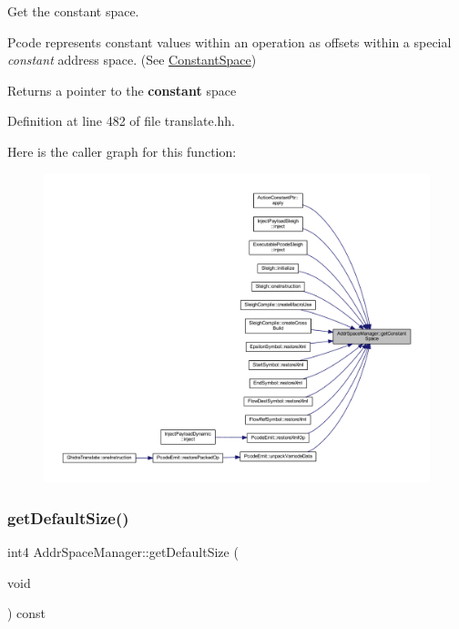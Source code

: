 Get the constant space. 

Pcode represents constant values within an operation as offsets within a special {\itshape constant} address space. (See \mbox{\hyperlink{class_constant_space}{Constant\+Space}}) \begin{DoxyReturn}{Returns}
a pointer to the {\bfseries{constant}} space 
\end{DoxyReturn}


Definition at line 482 of file translate.\+hh.

Here is the caller graph for this function\+:
\nopagebreak
\begin{figure}[H]
\begin{center}
\leavevmode
\includegraphics[width=350pt]{class_addr_space_manager_ab7dec6a4f5671fffb5d5645ebd2cb1f4_icgraph}
\end{center}
\end{figure}
\mbox{\label{class_addr_space_manager_ab1b808345dc85dc7e4f8e993fd739f96}} 
\subsubsection{\texorpdfstring{getDefaultSize()}{getDefaultSize()}}
{\footnotesize\ttfamily int4 Addr\+Space\+Manager\+::get\+Default\+Size (\begin{DoxyParamCaption}\item[{void}]{ }\end{DoxyParamCaption}) const\hspace{0.3cm}{\ttfamily [inline]}}



